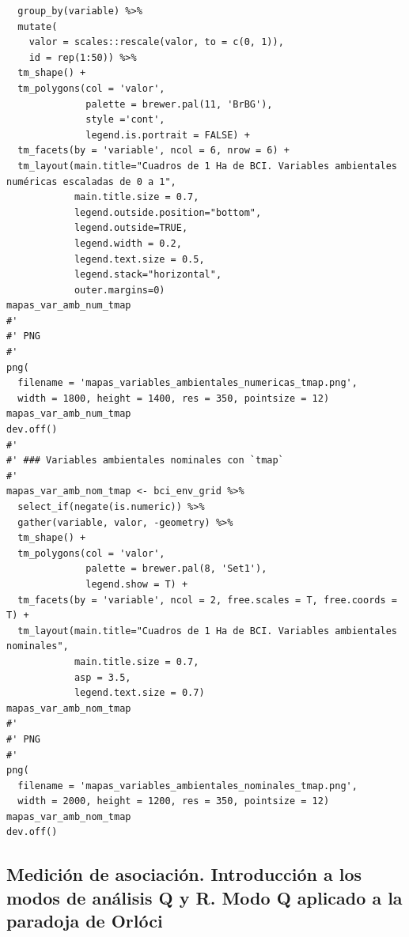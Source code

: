 \documentclass[11pt,]{article}
\begin{document}
\begin{verbatim}
  group_by(variable) %>% 
  mutate(
    valor = scales::rescale(valor, to = c(0, 1)),
    id = rep(1:50)) %>% 
  tm_shape() +
  tm_polygons(col = 'valor',
              palette = brewer.pal(11, 'BrBG'),
              style ='cont',
              legend.is.portrait = FALSE) +
  tm_facets(by = 'variable', ncol = 6, nrow = 6) +
  tm_layout(main.title="Cuadros de 1 Ha de BCI. Variables ambientales numéricas escaladas de 0 a 1",
            main.title.size = 0.7,
            legend.outside.position="bottom",
            legend.outside=TRUE,
            legend.width = 0.2,
            legend.text.size = 0.5,
            legend.stack="horizontal", 
            outer.margins=0)
mapas_var_amb_num_tmap
#'
#' PNG
#' 
png(
  filename = 'mapas_variables_ambientales_numericas_tmap.png',
  width = 1800, height = 1400, res = 350, pointsize = 12)
mapas_var_amb_num_tmap
dev.off()
#' 
#' ### Variables ambientales nominales con `tmap`
#' 
mapas_var_amb_nom_tmap <- bci_env_grid %>%
  select_if(negate(is.numeric)) %>% 
  gather(variable, valor, -geometry) %>% 
  tm_shape() +
  tm_polygons(col = 'valor',
              palette = brewer.pal(8, 'Set1'),
              legend.show = T) +
  tm_facets(by = 'variable', ncol = 2, free.scales = T, free.coords = T) +
  tm_layout(main.title="Cuadros de 1 Ha de BCI. Variables ambientales nominales",
            main.title.size = 0.7,
            asp = 3.5,
            legend.text.size = 0.7)
mapas_var_amb_nom_tmap
#'
#' PNG
#' 
png(
  filename = 'mapas_variables_ambientales_nominales_tmap.png',
  width = 2000, height = 1200, res = 350, pointsize = 12)
mapas_var_amb_nom_tmap
dev.off()
\end{verbatim}

\subsection{Medición de asociación. Introducción a los modos de análisis
Q y R. Modo Q aplicado a la paradoja de
Orlóci}\label{mediciuxf3n-de-asociaciuxf3n.-introducciuxf3n-a-los-modos-de-anuxe1lisis-q-y-r.-modo-q-aplicado-a-la-paradoja-de-orluxf3ci}
\end{document}
